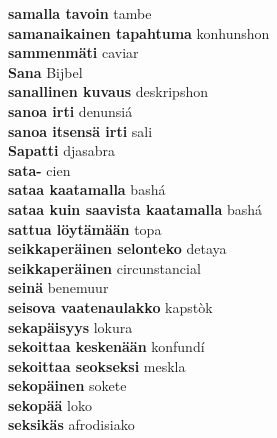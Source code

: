 \textbf{ samalla tavoin  } tambe \\
\textbf{ samanaikainen tapahtuma  } konhunshon \\
\textbf{ sammenmäti  } caviar \\
\textbf{ Sana  } Bijbel \\
\textbf{ sanallinen kuvaus  } deskripshon \\
\textbf{ sanoa irti  } denunsiá \\
\textbf{ sanoa itsensä irti  } sali \\
\textbf{ Sapatti  } djasabra \\
\textbf{ sata-  } cien \\
\textbf{ sataa kaatamalla  } bashá \\
\textbf{ sataa kuin saavista kaatamalla  } bashá \\
\textbf{ sattua löytämään  } topa \\
\textbf{ seikkaperäinen selonteko  } detaya \\
\textbf{ seikkaperäinen  } circunstancial \\
\textbf{ seinä  } benemuur \\
\textbf{ seisova vaatenaulakko  } kapstòk \\
\textbf{ sekapäisyys  } lokura \\
\textbf{ sekoittaa keskenään  } konfundí \\
\textbf{ sekoittaa seokseksi  } meskla \\
\textbf{ sekopäinen  } sokete \\
\textbf{ sekopää  } loko \\
\textbf{ seksikäs  } afrodisiako \\
